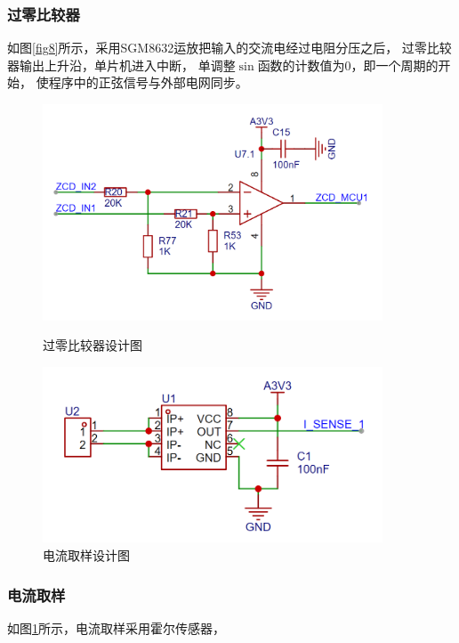 \documentclass[a4paper,12pt]{article}
\begin{document}
\subsubsection{过零比较器}
如图\ref{fig8}所示，采用SGM8632运放把输入的交流电经过电阻分压之后，
过零比较器输出上升沿，单片机进入中断，
单调整$\sin$函数的计数值为0，即一个周期的开始，
使程序中的正弦信号与外部电网同步。


\begin{figure}[htbp]
    \centering
    \begin{minipage}{0.45\textwidth}
        \centering
        \includegraphics[width=0.9\textwidth]{src/fig8.png}
        \caption{过零比较器设计图}
        \label{fig8}
    \end{minipage}
    \qquad
    \begin{minipage}{0.45\textwidth}
        \centering
        \includegraphics[width=0.9\textwidth]{src/fig11.png}
        \caption{电流取样设计图}
        \label{fig11}
    \end{minipage}
\end{figure}
\subsubsection{电流取样}
如图\ref{fig11}所示，电流取样采用霍尔传感器，
\end{document}
